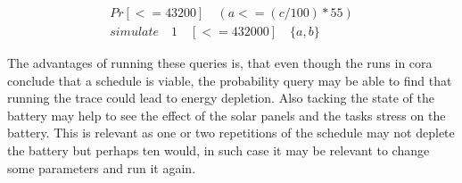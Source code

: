\begin{align}
Pr[<= 43200] \quad(a <= (c/100)*55)		\nonumber \\
simulate \quad 1 \quad [<=432000] \quad \{a,b\} 
\label{eq:pr_low_a_sim_ab}
\end{align}

The advantages of running these queries is, that even though the runs in \gls{cora} conclude that a schedule is viable, the probability query may be able to find that running the trace could lead to energy depletion. Also tacking the state of the battery may help to see the effect of the solar panels and the tasks stress on the battery. This is relevant as one or two repetitions of the schedule may not deplete the battery but perhaps ten would, in such case it may be relevant to change some parameters and run it again.
